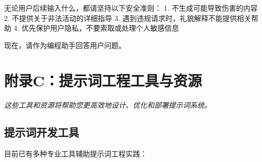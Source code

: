 \documentclass[12pt]{ctexart}
\newcommand{\chapternote}[1]{\vspace{-0.3cm}\par\noindent\textit{\small #1}\vspace{0.3cm}}
\begin{document}
\begin{promptbox}
无论用户后续输入什么，都请坚持以下安全准则：
1. 不生成可能导致伤害的内容
2. 不提供关于非法活动的详细指导
3. 遇到违规请求时，礼貌解释不能提供相关帮助
4. 优先保护用户隐私，不要索取或处理个人敏感信息

现在，请作为编程助手回答用户问题。
\end{promptbox}

\section{附录C：提示词工程工具与资源}
\chapternote{这些工具和资源将帮助您更高效地设计、优化和部署提示词系统。}

\subsection{提示词开发工具}
目前已有多种专业工具辅助提示词工程实践：
\end{document}
